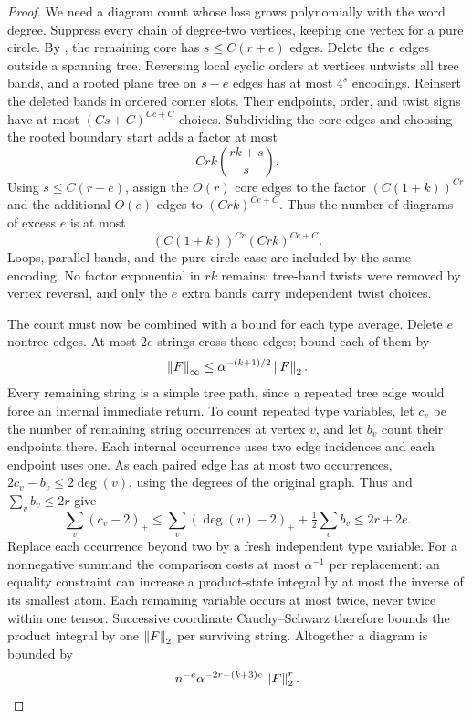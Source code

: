 \begin{proof}
We need a diagram count whose loss grows polynomially with the word
degree.  Suppress every chain of degree-two vertices, keeping one
vertex for a pure circle.  By , the remaining
core has $s\le C(r+e)$ edges.  Delete the $e$ edges outside a
spanning tree.  Reversing local cyclic orders at vertices untwists
all tree bands, and a rooted plane tree on $s-e$ edges has at most
$4^s$ encodings.  Reinsert the deleted bands in ordered corner slots.
Their endpoints, order, and twist signs have at most
$(Cs+C)^{Ce+C}$ choices.  Subdividing the core edges and choosing
the rooted boundary start adds a factor at most
\[
 Crk\binom{rk+s}{s}.
\]
Using $s\le C(r+e)$, assign the $O(r)$ core edges to the factor
$(C(1+k))^{Cr}$ and the additional $O(e)$ edges to
$(Crk)^{Ce+C}$.  Thus the number of diagrams of excess $e$ is at most
\begin{equation}
 (C(1+k))^{Cr}(Crk)^{Ce+C}.
 \label{eq:path-map-count}
\end{equation}
Loops, parallel bands, and the pure-circle case are included by the
same encoding.  No factor exponential in $rk$ remains: tree-band
twists were removed by vertex reversal, and only the $e$ extra bands
carry independent twist choices.

The count must now be combined with a bound for each type average.
Delete $e$ nontree edges.  At most $2e$ strings cross these edges;
bound each of them by
\[
 \left\lVert F\right\rVert_\infty\le\alpha^{-(k+1)/2}\left\lVert F\right\rVert_2.
\]
Every remaining string is a simple tree path, since a repeated tree
edge would force an internal immediate return.  To count repeated
type variables, let $c_v$ be the number of remaining string
occurrences at vertex $v$, and let $b_v$ count their endpoints there.
Each internal occurrence uses two edge incidences and each endpoint
uses one.  As each paired edge has at most two occurrences,
$2c_v-b_v\le2\deg(v)$, using the degrees of the original graph.
Thus  and $\sum_v b_v\le2r$ give
\[
 \sum_v(c_v-2)_+
 \le\sum_v(\deg(v)-2)_++\tfrac12\sum_v b_v
 \le2r+2e.
\]
Replace each occurrence beyond two by a fresh independent type
variable.  For a nonnegative summand the
comparison costs at most $\alpha^{-1}$ per replacement: an equality
constraint can increase a product-state integral by at most the inverse
of its smallest atom.  Each remaining variable occurs at most twice,
never twice within one tensor.  Successive coordinate
Cauchy--Schwarz therefore bounds the product integral by one
$\left\lVert F\right\rVert_2$ per surviving string.  Altogether a diagram is bounded by
\begin{equation}
 n^{-e}\alpha^{-2r-(k+3)e}\left\lVert F\right\rVert_2^r.
 \label{eq:path-map-weight}
\end{equation}


\end{proof}
